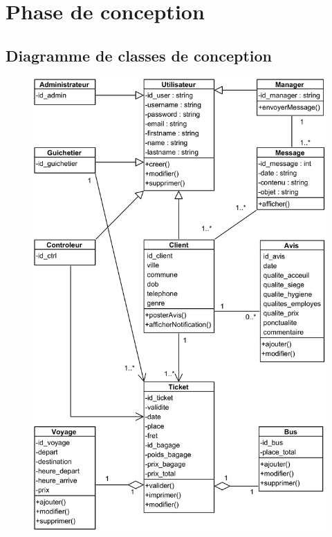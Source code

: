 \section[Phase de conception]{Phase de conception}
    \subsection[Diagramme de classes de conception]{Diagramme de classes de conception}
        \begin{figure}[H]
            \centering
            \includegraphics[width=130mm]{images/diagrammes-classe-de-conception/Classes de conception Class Diagram.png}
            \label{fig:mdSysteme}
        \end{figure}
